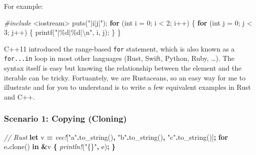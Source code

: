 \documentclass[
]{book}
\newenvironment{Shaded}{\begin{snugshade}}{\end{snugshade}}
\newcommand{\CommentTok}[1]{\textcolor[rgb]{0.56,0.35,0.01}{\textit{#1}}}
\newcommand{\ControlFlowTok}[1]{\textcolor[rgb]{0.13,0.29,0.53}{\textbf{#1}}}
\newcommand{\DataTypeTok}[1]{\textcolor[rgb]{0.13,0.29,0.53}{#1}}
\newcommand{\DecValTok}[1]{\textcolor[rgb]{0.00,0.00,0.81}{#1}}
\newcommand{\ImportTok}[1]{#1}
\newcommand{\KeywordTok}[1]{\textcolor[rgb]{0.13,0.29,0.53}{\textbf{#1}}}
\newcommand{\NormalTok}[1]{#1}
\newcommand{\OperatorTok}[1]{\textcolor[rgb]{0.81,0.36,0.00}{\textbf{#1}}}
\newcommand{\PreprocessorTok}[1]{\textcolor[rgb]{0.56,0.35,0.01}{\textit{#1}}}
\newcommand{\SpecialCharTok}[1]{\textcolor[rgb]{0.00,0.00,0.00}{#1}}
\newcommand{\StringTok}[1]{\textcolor[rgb]{0.31,0.60,0.02}{#1}}
\begin{document}
For example:

\begin{Shaded}
\begin{Highlighting}[]
\PreprocessorTok{\#include }\ImportTok{\textless{}iostream\textgreater{}}
\NormalTok{puts(}\StringTok{"|i|j|"}\NormalTok{);}
\ControlFlowTok{for}\NormalTok{ (}\DataTypeTok{int}\NormalTok{ i = }\DecValTok{0}\NormalTok{; i \textless{} }\DecValTok{2}\NormalTok{; i++)}
\NormalTok{\{}
    \ControlFlowTok{for}\NormalTok{ (}\DataTypeTok{int}\NormalTok{ j = }\DecValTok{0}\NormalTok{; j \textless{} }\DecValTok{3}\NormalTok{; j++)}
\NormalTok{    \{}
\NormalTok{        printf(}\StringTok{"|}\SpecialCharTok{\%d}\StringTok{|}\SpecialCharTok{\%d}\StringTok{|}\SpecialCharTok{\textbackslash{}n}\StringTok{"}\NormalTok{, i, j);}
\NormalTok{    \}}
\NormalTok{\}}
\end{Highlighting}
\end{Shaded}

C++11 introduced the range-based \texttt{for} statement, which is also known as a \texttt{for...in} loop in most other languages (Rust, Swift, Python, Ruby, \ldots). The syntax itself is easy but knowing the relationship between the element and the iterable can be tricky. Fortuantely, we are Rustaceans, so an easy way for me to illustrate and for you to understand is to write a few equivalent examples in Rust and C++.

\hypertarget{scenario-1-copying-cloning}{%
\subsubsection{Scenario 1: Copying (Cloning)}\label{scenario-1-copying-cloning}}

\begin{Shaded}
\begin{Highlighting}[]
\CommentTok{// Rust}
\KeywordTok{let}\NormalTok{ v }\OperatorTok{=} \PreprocessorTok{vec!}\NormalTok{[}\StringTok{"a"}\OperatorTok{.}\NormalTok{to\_string()}\OperatorTok{,} \StringTok{"b"}\OperatorTok{.}\NormalTok{to\_string()}\OperatorTok{,} \StringTok{"c"}\OperatorTok{.}\NormalTok{to\_string()]}\OperatorTok{;}
\KeywordTok{for}\NormalTok{ e}\OperatorTok{.}\NormalTok{clone() }\KeywordTok{in} \OperatorTok{\&}\NormalTok{v }\OperatorTok{\{}
    \PreprocessorTok{println!}\NormalTok{(}\StringTok{"\{\}"}\OperatorTok{,}\NormalTok{ e)}\OperatorTok{;}
\OperatorTok{\}}
\end{Highlighting}
\end{Shaded}
\end{document}
